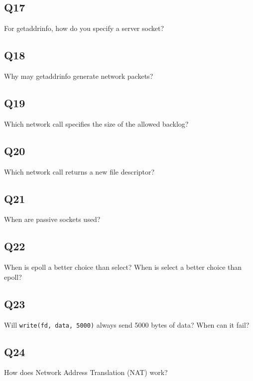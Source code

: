 \subsection{Q17}\label{q17}

For getaddrinfo, how do you specify a server socket?

\subsection{Q18}\label{q18}

Why may getaddrinfo generate network packets?

\subsection{Q19}\label{q19}

Which network call specifies the size of the allowed backlog?

\subsection{Q20}\label{q20}

Which network call returns a new file descriptor?

\subsection{Q21}\label{q21}

When are passive sockets used?

\subsection{Q22}\label{q22}

When is epoll a better choice than select? When is select a better choice than epoll?

\subsection{Q23}\label{q23}

Will \texttt{write(fd,\ data,\ 5000)} always send 5000 bytes of data? When can it fail?

\subsection{Q24}\label{q24}

How does Network Address Translation (NAT) work?

